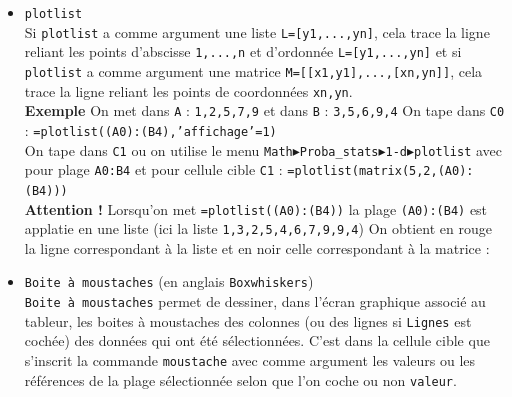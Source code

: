 \documentclass[a4paper,11pt]{book}
\begin{document}
\begin{itemize}
\item {\tt plotlist}\\
Si {\tt plotlist} a comme argument une liste {\tt L=[y1,...,yn]}, cela trace 
la ligne reliant les points d'abscisse {\tt 1,...,n} et d'ordonn\'ee 
{\tt L=[y1,...,yn]} et si {\tt plotlist} a comme argument une matrice 
{\tt M=[[x1,y1],...,[xn,yn]]}, cela trace la ligne reliant les points de 
coordonn\'ees {\tt xn,yn}.\\
{\bf Exemple}
On met dans {\tt A} : {\tt 1,2,5,7,9} et dans {\tt B} : {\tt 3,5,6,9,4}
On tape dans {\tt C0} : {\tt =plotlist((A0):(B4),'affichage'=1)}\\
On tape dans {\tt C1} ou  on utilise le menu 
{\tt Math$\blacktriangleright$Proba\_stats$\blacktriangleright$1-d$\blacktriangleright$plotlist} avec pour plage {\tt A0:B4} et pour cellule cible {\tt C1} : 
{\tt =plotlist(matrix(5,2,(A0):(B4)))}\\
{\bf Attention !}
Lorsqu'on met {\tt =plotlist((A0):(B4))} la plage {\tt (A0):(B4)} est applatie 
en une liste (ici la liste {\tt 1,3,2,5,4,6,7,9,9,4})
On obtient en rouge la ligne correspondant \`a la liste et en noir celle
correspondant \`a la matrice :
\begin{center}\end{center}

\item {\tt Boite \`a moustaches} (en anglais {\tt Boxwhiskers})\\
{\tt Boite \`a moustaches} permet de dessiner, dans 
l'\'ecran graphique associ\'e au tableur, les 
boites \`a moustaches des colonnes (ou des lignes si {\tt Lignes} est 
coch\'ee) des donn\'ees qui ont \'et\'e s\'electionn\'ees. C'est dans la 
cellule cible  que s'inscrit la commande {\tt moustache} avec comme argument
les valeurs ou les r\'ef\'erences de la plage s\'electionn\'ee  selon que 
l'on coche ou non {\tt valeur}.


\end{itemize}
\end{document}
